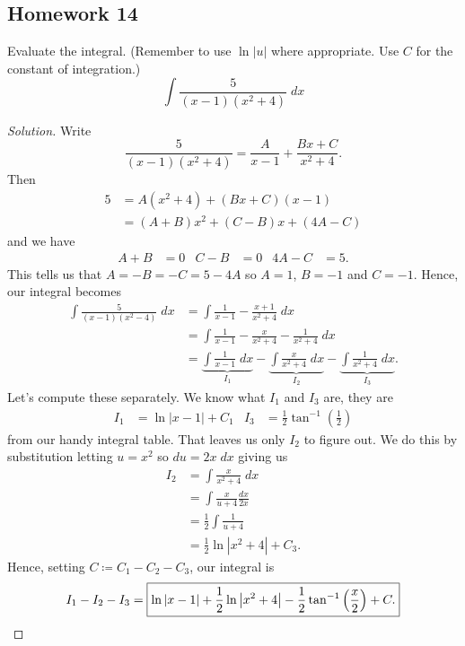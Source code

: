 \subsection{Homework 14}
\begin{problem}[WebAssign, HW 14, \# 1]
Evaluate the integral. (Remember to use $\ln|u|$ where appropriate. Use $C$
for the constant of integration.)
$$
\int\frac{5}{(x-1)(x^2+4)}\;dx
$$
\end{problem}
\begin{proof}[Solution]
Write
\[
\frac{5}{(x-1)(x^2+4)}=\frac{A}{x-1}+\frac{Bx+C}{x^2+4}.
\]
Then
\begin{align*}
5&=A(x^2+4)+(Bx+C)(x-1)\\
 &=(A+B)x^2+(C-B)x+(4A-C)
\end{align*}
and we have
\begin{align*}
A+B&=0&C-B&=0&4A-C&=5.
\end{align*}
This tells us that $A=-B=-C=5-4A$ so $A=1$, $B=-1$ and $C=-1$. Hence, our
integral becomes
\begin{align*}
\int\frac{5}{(x-1)(x^2-4)}\;dx
&=\int\frac{1}{x-1}-\frac{x+1}{x^2+4}\;dx\\
&=\int\frac{1}{x-1}-\frac{x}{x^2+4}-\frac{1}{x^2+4}\;dx\\
&=\underbrace{\int\frac{1}{x-1}\;dx}_{I_1}
-\underbrace{\int\frac{x}{x^2+4}\;dx}_{I_2}
-\underbrace{\int\frac{1}{x^2+4}\;dx}_{I_3}.
\end{align*}
Let's compute these separately. We know what $I_1$ and $I_3$ are, they are
\begin{align*}
I_1&=\ln|x-1|+C_1&I_3&=\frac{1}{2}\tan^{-1}\left(\frac{1}{2}\right)
\end{align*}
from our handy integral table. That leaves us only $I_2$ to figure out. We
do this by substitution letting $u=x^2$ so $du=2x\;dx$ giving us
\begin{align*}
I_2&=\int\frac{x}{x^2+4}\;dx\\
&=\int\frac{x}{u+4}\frac{dx}{2x}\\
&=\frac{1}{2}\int\frac{1}{u+4}\\
&=\frac{1}{2}\ln\left|x^2+4\right|+C_3.
\end{align*}
Hence, setting $C\coloneqq C_1-C_2-C_3$, our integral is
\[
I_1-I_2-I_3=\boxed{\ln|x-1|+\frac{1}{2}\ln\left|x^2+4\right|-\frac{1}{2}\tan^{-1}\left(\frac{x}{2}\right)+C.}\qedhere
\]
\end{proof}

